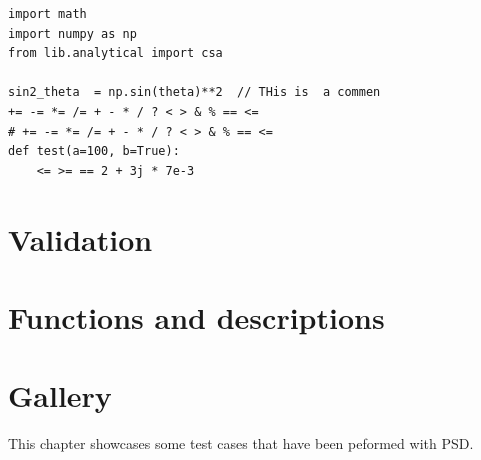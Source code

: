 \documentclass{report}
\begin{document}



\begin{lstlisting}[language=PSD]
import math
import numpy as np
from lib.analytical import csa

sin2_theta  = np.sin(theta)**2  // THis is  a commen
+= -= *= /= + - * / ? < > & % == <=
# += -= *= /= + - * / ? < > & % == <=
def test(a=100, b=True):
    <= >= == 2 + 3j * 7e-3
\end{lstlisting}

\chapter{Validation}


\chapter{Functions and descriptions}

\chapter{Gallery}

This chapter showcases some test cases that have been peformed with PSD.
\end{document}
